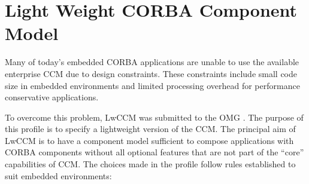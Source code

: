 \section{Light Weight CORBA Component Model}

Many of today's embedded CORBA applications are unable to use the available 
enterprise CCM due to design constraints.
These constraints include small code size in embedded environments and 
limited processing overhead for performance conservative applications.

\vspace{3mm}
\noindent
To overcome this problem, LwCCM
was submitted to the OMG \cite{LwCCM-Specification}.
The purpose of this profile is to specify a lightweight version of the CCM.
The principal aim of LwCCM is to have a component model sufficient to compose
applications with CORBA components without all optional features that are
not part of the ``core'' capabilities of CCM.
The choices made in the profile follow rules established to suit embedded
environments:
